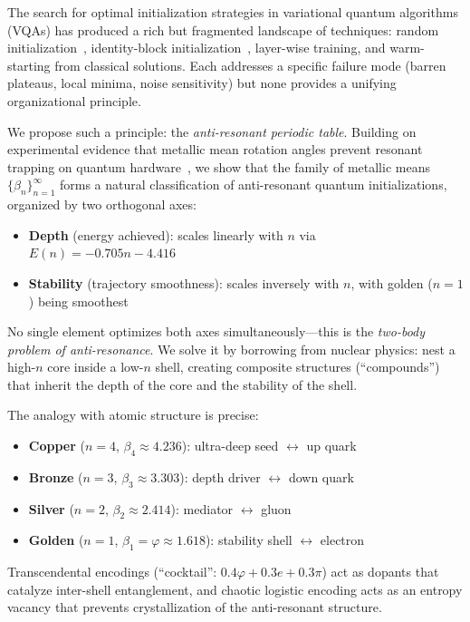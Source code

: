 \documentclass[twocolumn,showpacs,preprintnumbers,amsmath,amssymb,aps,prl]{revtex4-2}
\begin{document}
The search for optimal initialization strategies in variational quantum algorithms (VQAs) has produced a rich but fragmented landscape of techniques: random initialization~\cite{mcclean2018barren}, identity-block initialization~\cite{grant2019initialization}, layer-wise training, and warm-starting from classical solutions. Each addresses a specific failure mode (barren plateaus, local minima, noise sensitivity) but none provides a unifying organizational principle.

We propose such a principle: the \emph{anti-resonant periodic table}. Building on experimental evidence that metallic mean rotation angles prevent resonant trapping on quantum hardware~\cite{knopp2026qgp}, we show that the family of metallic means $\{\beta_n\}_{n=1}^{\infty}$ forms a natural classification of anti-resonant quantum initializations, organized by two orthogonal axes:
\begin{itemize}
    \item \textbf{Depth} (energy achieved): scales linearly with $n$ via $E(n) = -0.705n - 4.416$
    \item \textbf{Stability} (trajectory smoothness): scales inversely with $n$, with golden ($n\!=\!1$) being smoothest
\end{itemize}

No single element optimizes both axes simultaneously---this is the \emph{two-body problem of anti-resonance}. We solve it by borrowing from nuclear physics: nest a high-$n$ core inside a low-$n$ shell, creating composite structures (``compounds'') that inherit the depth of the core and the stability of the shell.

The analogy with atomic structure is precise:
\begin{itemize}
    \item \textbf{Copper} ($n\!=\!4$, $\beta_4 \approx 4.236$): ultra-deep seed $\leftrightarrow$ up quark
    \item \textbf{Bronze} ($n\!=\!3$, $\beta_3 \approx 3.303$): depth driver $\leftrightarrow$ down quark
    \item \textbf{Silver} ($n\!=\!2$, $\beta_2 \approx 2.414$): mediator $\leftrightarrow$ gluon
    \item \textbf{Golden} ($n\!=\!1$, $\beta_1 = \varphi \approx 1.618$): stability shell $\leftrightarrow$ electron
\end{itemize}

Transcendental encodings (``cocktail'': $0.4\varphi + 0.3e + 0.3\pi$) act as dopants that catalyze inter-shell entanglement, and chaotic logistic encoding acts as an entropy vacancy that prevents crystallization of the anti-resonant structure.
\end{document}
